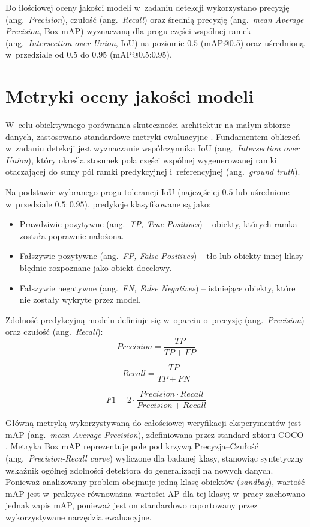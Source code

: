 Do ilościowej oceny jakości modeli w~zadaniu detekcji wykorzystano precyzję (ang.\ \emph{Precision}), czułość (ang.\ \emph{Recall}) oraz średnią precyzję (ang.\ \emph{mean Average Precision}, Box mAP) wyznaczaną dla progu części wspólnej ramek (ang.\ \emph{Intersection over Union}, IoU) na poziomie $0.5$ (mAP@0.5) oraz uśrednioną w~przedziale od $0.5$ do $0.95$ (mAP@0.5:0.95).

\section{Metryki oceny jakości modeli}

W~celu obiektywnego porównania skuteczności architektur na małym zbiorze danych, zastosowano standardowe metryki ewaluacyjne \cite{Padilla2020}. Fundamentem obliczeń w~zadaniu detekcji jest wyznaczanie współczynnika IoU (ang.\ \emph{Intersection over Union}), który określa stosunek pola części wspólnej wygenerowanej ramki otaczającej do sumy pól ramki predykcyjnej i~referencyjnej (ang.\ \emph{ground truth}).

Na podstawie wybranego progu tolerancji IoU (najczęściej $0.5$ lub uśrednione w~przedziale $0.5:0.95$), predykcje klasyfikowane są jako:
\begin{itemize}
    \item Prawdziwie pozytywne (ang.\ \emph{TP, True Positives}) -- obiekty, których ramka została poprawnie nałożona.
    \item Fałszywie pozytywne (ang.\ \emph{FP, False Positives}) -- tło lub obiekty innej klasy błędnie rozpoznane jako obiekt docelowy.
    \item Fałszywie negatywne (ang.\ \emph{FN, False Negatives}) -- istniejące obiekty, które nie zostały wykryte przez model.
\end{itemize}
Zdolność predykcyjną modelu definiuje się w~oparciu o~precyzję (ang.\ \emph{Precision}) oraz czułość (ang.\ \emph{Recall}):
\begin{equation}
Precision = \frac{TP}{TP + FP}
\end{equation}

\begin{equation}
Recall = \frac{TP}{TP + FN}
\end{equation}

\begin{equation}
F1 = 2 \cdot \frac{Precision \cdot Recall}{Precision + Recall}
\end{equation}

Główną metryką wykorzystywaną do całościowej weryfikacji eksperymentów jest mAP (ang.\ \emph{mean Average Precision}), zdefiniowana przez standard zbioru COCO \cite{Lin2014}. Metryka Box mAP reprezentuje pole pod krzywą Precyzja--Czułość (ang.\ \emph{Precision-Recall curve}) wyliczone dla badanej klasy, stanowiąc syntetyczny wskaźnik ogólnej zdolności detektora do generalizacji na nowych danych. Ponieważ analizowany problem obejmuje jedną klasę obiektów (\emph{sandbag}), wartość mAP jest w~praktyce równoważna wartości AP dla tej klasy; w~pracy zachowano jednak zapis mAP, ponieważ jest on standardowo raportowany przez wykorzystywane narzędzia ewaluacyjne.

